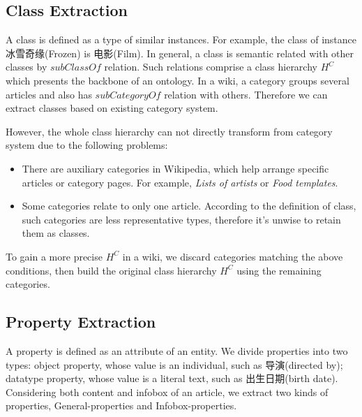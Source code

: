\documentclass[runningheads,a4paper]{llncs}
\begin{document}
\subsection{Class Extraction}
\label{sec:ce}
A class is defined as a type of similar instances. For example, the class of instance 冰雪奇缘(Frozen) is 电影(Film). In general, a class is semantic related with other classes by $subClassOf$ relation. Such relations comprise a class hierarchy $H^C$ which presents the backbone of an ontology. In a wiki, a category groups several articles and also has $subCategoryOf$ relation with others. Therefore we can extract classes based on existing category system.

However, the whole class hierarchy can not directly transform from category system due to the following problems:
\begin{itemize}
    \item There are auxiliary categories in Wikipedia, which help arrange specific articles or category pages. For example, \emph{Lists of artists} or \emph{Food templates}.
    \item Some categories relate to only one article. According to the definition of class, such categories are less representative types, therefore it's unwise to retain them as classes.
\end{itemize}

To gain a more precise $H^C$ in a wiki, we discard categories matching the above conditions, then build the original class hierarchy $H^C$ using the remaining categories.


\subsection{Property Extraction}
\label{sec:pe}
A property is defined as an attribute of an entity. We divide properties into two types: object property, whose value is an individual, such as 导演(directed by); datatype property, whose value is a literal text, such as 出生日期(birth date). Considering both content and infobox of an article, we extract two kinds of properties, General-properties and Infobox-properties.
\end{document}
